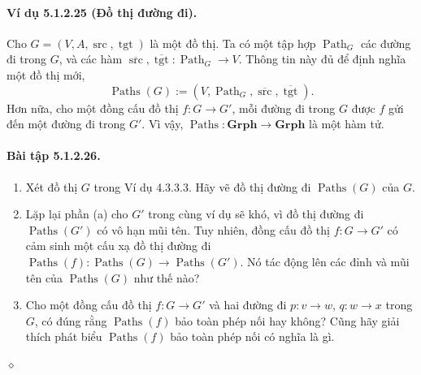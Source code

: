 \paragraph{Ví dụ 5.1.2.25 (Đồ thị đường đi).} Cho $G=(V,A,\operatorname{src},\operatorname{tgt})$ là một đồ thị. Ta có một tập hợp $\operatorname{Path}_G$ các đường đi trong $G$, và các hàm $\overline{\operatorname{src}},\overline{\operatorname{tgt}}:\operatorname{Path}_G\to V$. Thông tin này đủ để định nghĩa một đồ thị mới,
\[\operatorname{Paths}(G):=(V,\operatorname{Path}_G,\overline{\operatorname{src}},\overline{\operatorname{tgt}}).\]
Hơn nữa, cho một đồng cấu đồ thị $f:G\to G'$, mỗi đường đi trong $G$ được $f$ gửi đến một đường đi trong $G'$. Vì vậy, $\operatorname{Paths}:\mathbf{Grph}\to\mathbf{Grph}$ là một hàm tử.
\paragraph{Bài tập 5.1.2.26.}
\begin{enumerate}[label=\alph*.]
\item Xét đồ thị $G$ trong Ví dụ 4.3.3.3. Hãy vẽ đồ thị đường đi $\operatorname{Paths}(G)$ của $G$.
\item Lặp lại phần (a) cho $G'$ trong cùng ví dụ sẽ khó, vì đồ thị đường đi $\operatorname{Paths}(G')$ có vô hạn mũi tên. Tuy nhiên, đồng cấu đồ thị $f:G\to G'$ có cảm sinh một cấu xạ đồ thị đường đi $\operatorname{Paths}(f):\operatorname{Paths}(G)\to\operatorname{Paths}(G')$. Nó tác động lên các đỉnh và mũi tên của $\operatorname{Paths}(G)$ như thế nào?
\item Cho một đồng cấu đồ thị $f:G\to G'$ và hai đường đi $p:v\to w$, $q:w\to x$ trong $G$, có đúng rằng $\operatorname{Paths}(f)$ bảo toàn phép nối hay không? Cũng hãy giải thích phát biểu $\operatorname{Paths}(f)$ bảo toàn phép nối có nghĩa là gì.
\end{enumerate}\hfill$\diamond$
